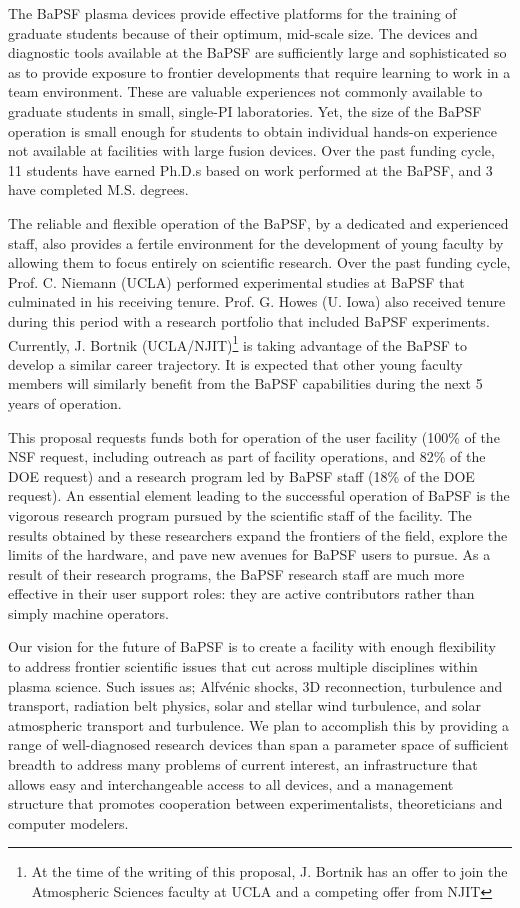 \documentclass[11pt]{article}
\begin{document}
The BaPSF plasma devices provide effective platforms for the training
of graduate students because of their optimum, mid-scale size. The
devices and diagnostic tools available at the BaPSF are sufficiently
large and sophisticated so as to provide exposure to frontier
developments that require learning to work in a team
environment. These are valuable experiences not commonly available to
graduate students in small, single-PI laboratories. Yet, the size of
the BaPSF operation is small enough for students to obtain individual
hands-on experience not available at facilities with large fusion
devices. Over the past funding cycle, 11 students have earned Ph.D.s
based on work performed at the BaPSF, and 3 have completed
M.S. degrees.

The reliable and flexible operation of the BaPSF, by a dedicated and
experienced staff, also provides a fertile environment for the
development of young faculty by allowing them to focus entirely on
scientific research. Over the past funding cycle, Prof. C. Niemann
(UCLA) performed experimental studies at BaPSF that culminated in his
receiving tenure. Prof. G. Howes (U. Iowa) also received tenure during
this period with a research portfolio that included BaPSF experiments.
Currently, J. Bortnik (UCLA/NJIT)\footnote{At the time of the writing
  of this proposal, J. Bortnik has an offer to join the Atmospheric
  Sciences faculty at UCLA and a competing offer from NJIT} is taking advantage of the BaPSF to develop
a similar career trajectory. It is expected that other young faculty
members will similarly benefit from the BaPSF capabilities during the
next 5 years of operation.

This proposal requests funds both for operation of the user facility
(100\% of the NSF request, including outreach as part of facility
operations, and 82\% of the DOE request) and a research program led by
BaPSF staff (18\% of the DOE request).  An essential element leading
to the successful operation of BaPSF is the vigorous research program
pursued by the scientific staff of the facility. The results obtained
by these researchers expand the frontiers of the field, explore the
limits of the hardware, and pave new avenues for BaPSF users to
pursue. As a result of their research programs, the BaPSF research
staff are much more effective in their user support roles: they are
active contributors rather than simply machine operators.

Our vision for the future of BaPSF is to create a facility with enough
flexibility to address frontier scientific issues that cut across
multiple disciplines within plasma science. Such issues as; Alfvénic
shocks, 3D reconnection, turbulence and transport, radiation belt
physics, solar and stellar wind turbulence, and solar atmospheric
transport and turbulence. We plan to accomplish this by providing a
range of well-diagnosed research devices than span a parameter space
of sufficient breadth to address many problems of current interest, an
infrastructure that allows easy and interchangeable access to all
devices, and a management structure that promotes cooperation between
experimentalists, theoreticians and computer modelers.
\end{document}

